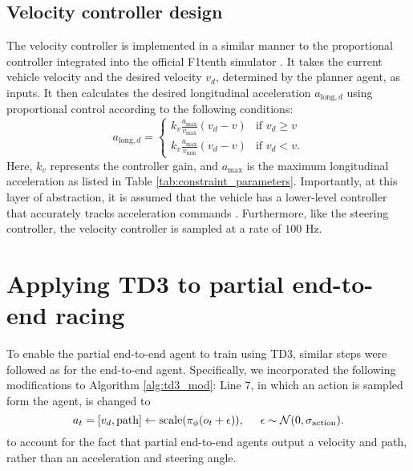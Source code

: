 
\subsection{Velocity controller design}

The velocity controller is implemented in a similar manner to the proportional controller integrated into the official F1tenth simulator \cite{f1tenth}.
It takes the current vehicle velocity and the desired velocity $v_d$, determined by the planner agent, as inputs. 
It then calculates the desired longitudinal acceleration $a_{\text{long},d}$ using proportional control according to the following conditions:
\begin{equation}
    a_{\text{long},d} = 
    \begin{cases}
        k_v \frac{a_{\text{max}}}{v_{\text{max}}}(v_d - v) & \text{if } v_d \geq v\\
        k_v \frac{a_{\text{max}}}{v_{\text{min}}}(v_d - v) & \text{if } v_d < v.
    \end{cases}
\label{eq:vel_control}
\end{equation}
Here, $k_v$ represents the controller gain, and $a_{\text{max}}$ is the maximum longitudinal acceleration as listed in Table \ref{tab:constraint_parameters}.
Importantly, at this layer of abstraction, it is assumed that the vehicle has a lower-level controller that accurately tracks acceleration commands \cite{Betz2021, Rajamani2012}.
Furthermore, like the steering controller, the velocity controller is sampled at a rate of $100$ Hz.








\section{Applying TD3 to partial end-to-end racing}\label{sec:TD3_pete}

To enable the partial end-to-end agent to train using TD3, similar steps were followed as for the end-to-end agent. 
Specifically, we incorporated the following modifications to Algorithm \ref{alg:td3_mod}:
Line $7$, in which an action is sampled form the agent, is changed to
\begin{equation}\label{eq:pete_agent_sample}
    a_{t} = [v_d, \text{path}] \leftarrow \text{scale}( \pi_{\phi}(o_t+\epsilon) ), \hspace{0.5cm} \epsilon \sim \mathcal{N}(0, \sigma_{\text{action}}).
\end{equation}
to account for the fact that partial end-to-end agents output a velocity and path, rather than an acceleration and steering angle.


